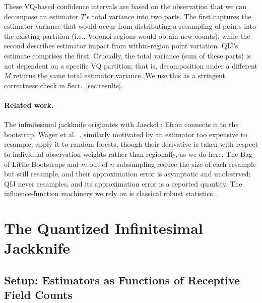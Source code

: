 \documentclass[runningheads]{llncs}
\begin{document}
These VQ-based confidence intervals are based on the observation that we can decompose an estimator $T$'s total variance into two parts. The first captures the estimator variance that would occur from distributing a resampling of points into the existing partition (i.e., Voronoi regions would obtain new counts), while the second describes estimator impact from within-region point variation. QIJ's estimate comprises the first. Crucially, the total variance (sum of these parts) is not dependent on a specific VQ partition; that is, decomposition under a different $M$ returns the same total estimator variance. We use this as a stringent correctness check in Sect.~\ref{sec:results}.

\paragraph{Related work.} The infinitesimal jackknife originates with Jaeckel \cite{jaeckel1972}; Efron \cite{efron1982} connects it to the bootstrap. Wager et al.\ \cite{wager2014}, similarly motivated by an estimator too expensive to resample, apply it to random forests, though their derivative is taken with respect to individual observation weights rather than regionally, as we do here. The Bag of Little Bootstraps \cite{kleiner2014} and $m$-out-of-$n$ subsampling \cite{bickel1997} reduce the size of each resample but still resample, and their approximation error is asymptotic and unobserved; QIJ never resamples, and its approximation error is a reported quantity. The influence-function machinery we rely on is classical robust statistics \cite{hampel1974,stefanski2002}.


\section{The Quantized Infinitesimal Jackknife}\label{sec:method}

\subsection{Setup: Estimators as Functions of Receptive Field Counts}\label{sec:setup}
\end{document}
